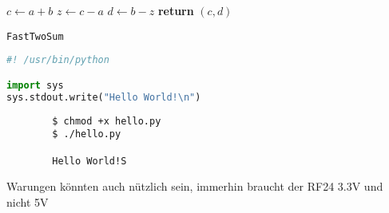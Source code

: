 \documentclass{article}
\begin{document}
\begin{center}
	\begin{minipage}{0.5\linewidth} %
		\begin{algorithm}[H]
			\medskip
			$c \leftarrow a + b$ \;
			$z \leftarrow c - a$ \;
			$d \leftarrow b - z$ \;
			{\bf return} $(c,d)$ \;
			\caption{\texttt{FastTwoSum}} %
			\label{alg:fastTwoSum}   %
		\end{algorithm}
	\end{minipage}
\end{center}


\begin{file}[hello.py]
\begin{lstlisting}[language=Python]
#! /usr/bin/python

import sys
sys.stdout.write("Hello World!\n")
\end{lstlisting}
\end{file}



\begin{commandline}
	\begin{verbatim}
		$ chmod +x hello.py
		$ ./hello.py

		Hello World!S
	\end{verbatim}
\end{commandline}


\begin{warn}[Notice:]
  Warungen könnten auch nützlich sein, immerhin braucht der RF24 3.3V und nicht 5V
\end{warn}

\end{document}
